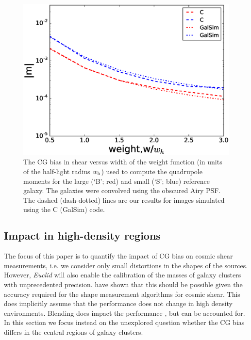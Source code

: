 \documentclass[useAMS,usenatbib]{mnras}
\begin{document}
%
\begin{figure}
  \centerline{\includegraphics[width=\hsize]{zweight_airy.eps}}
\caption{The CG bias in shear versus width of the weight function (in
  units of the half-light radius $w_{\rm h}$) used to compute the
  quadrupole moments for the large (`B'; red) and small (`S';
  blue) reference galaxy. The galaxies were convolved using the obscured Airy
  PSF. The dashed (dash-dotted) lines are our
  results for images simulated using the {\sc C} ({\sc GalSim}) code.}
\label{fig:biasofweight}
\end{figure}
%
\subsection{Impact in high-density regions}

The focus of this paper is to quantify the impact of CG bias on cosmic shear measurements, 
i.e. we consider only small distortions in the shapes of the sources. However, {\it Euclid} will
also enable the calibration of the masses of galaxy clusters with unprecedented precision.
\cite{Koehlinger15} have shown that this should be possible given the accuracy required 
for the shape measurement algorithms for cosmic shear. This does implicitly assume that the 
performance does not change in high density environments. Blending does impact the performance
\citep{Hoekstra17}, but can be accounted for. In this section we focus instead on the unexplored question
whether the CG bias differs in the central regions of galaxy clusters.
\end{document}
